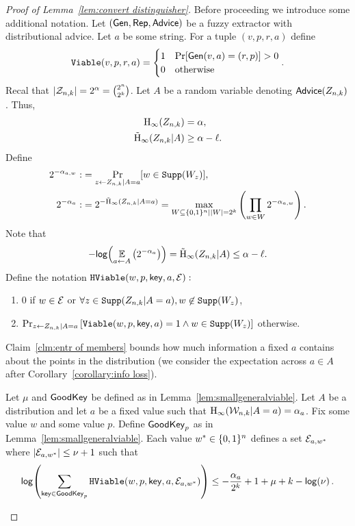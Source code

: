 \begin{proof}[Proof of Lemma~\ref{lem:convert distinguisher}]
Before proceeding we introduce some additional notation.
 Let $({\mathsf{Gen}}, {\mathsf{Rep}}, {\mathsf{Advice}})$ be a fuzzy extractor with distributional advice. Let $a$ be some string.  For a tuple $(v, p, r, a)$ define 
\[
\mathtt{Viable}(v, p, r,a) = \begin{cases} 1& \Pr[{\mathsf{Gen}}(v, a) = (r, p)]>0\\0&\text{otherwise}\end{cases}.\]
 Recal that $|\mathcal{Z}_{n,k}| = 2^\alpha = {2^n\choose 2^k}$.  Let $A$ be a random variable denoting ${\mathsf{Advice}}(Z_{n,k})$.  Thus,  
\begin{align*}
\mathrm{H}_\infty(Z_{n,k})&=\alpha,\\
\tilde{\mathrm{H}}_\infty(Z_{n,k}|A)&\ge \alpha - \ell.
\end{align*}
Define 
\begin{align*}
2^{-\alpha_{a,w}}:&=\Pr_{z\leftarrow Z_{n,k} | A=a}[w\in \mathtt{Supp}(W_z)],\\
2^{-\alpha_a}:&=2^{-\tilde{\mathrm{H}}_\infty(Z_{n,k}|A=a)}=\max_{W\subseteq \{0, 1\}^n | |W|=2^k}\left(\prod_{w\in W} 2^{-\alpha_{a,w}} \right).
\end{align*}  
 Note that \[-\mathsf{log}\!\left(\operatorname*{\mathbb{E}}_{a\leftarrow A} \left(2^{-\alpha_a} \right)\right) =\tilde{\mathrm{H}}_\infty(Z_{n,k}|A)\le \alpha-\ell.\] 
 Define the notation
$\mathtt{HViable}(w, p, \mathsf{key}, a, \mathcal{E}):$
\begin{enumerate}
\item 
$0$ if $ w\in \mathcal{E}$ or $\forall z\in\mathtt{Supp}(Z_{n,k}|A=a), w\not\in\mathtt{Supp}(W_z)$,
\item $
\Pr_{z\leftarrow Z_{n,k} |A =a}\left[\mathtt{Viable}(w, p, \mathsf{key}, a) = 1 \wedge w\in \mathtt{Supp}(W_z)\right]$ otherwise.
\end{enumerate}

Claim~\ref{clm:entr of members} bounds how much information a fixed $a$ contains about the points in the distribution (we consider the expectation across $a\in A$ after Corollary~\ref{corollary:info loss}).   

\begin{claim}
Let $\mu$ and $\mathsf{GoodKey}$ be defined as in Lemma~\ref{lem:smallgeneralviable}.
Let $A$ be a distribution and let $a$ be a fixed value such that $\mathrm{H}_\infty(\mathcal{W}_{n,k}|A=a) =\alpha_a$.  Fix some value $w$ and some value $p$. Define $\mathsf{GoodKey}_p$ as in Lemma~\ref{lem:smallgeneralviable}.  Each value $w^*\in\{0, 1\}^n$ defines a set $\mathcal{E}_{a, w^*}$ where $|\mathcal{E}_{a,w^*}| \le \nu+1$ such that
\begin{align*}
\mathsf{log}\!\left(\sum_{\mathsf{key}\in\mathsf{GoodKey}_p}\mathtt{HViable}(w, p, \mathsf{key},a, \mathcal{E}_{a,w^*})\right)\le -\frac{\alpha_a}{2^k}+1+\mu+k-\mathsf{log}\!\left(\nu\right).
\end{align*}


\end{claim}
\end{proof}
